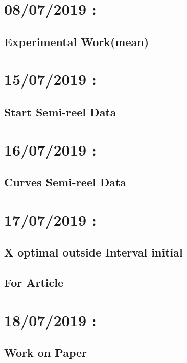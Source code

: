 \documentclass[a4paper,10pt]{article}
\begin{document}
  	\section{08/07/2019 :}
  		\subsection{Experimental Work(mean)}
  			
\clearpage

  	
  	\section{15/07/2019 :}
  		\subsection{Start Semi-reel Data}
  			
  			
  	\section{16/07/2019 :}
  		\subsection{Curves Semi-reel Data}
  			
  	
  	\section{17/07/2019 :}
  		\subsection{X optimal outside Interval initial}
  			
  			
  		\subsection{For Article}
  			
  			
  	\section{18/07/2019 :}
  		\subsection{Work on Paper}
  			
  			
\end{document}
